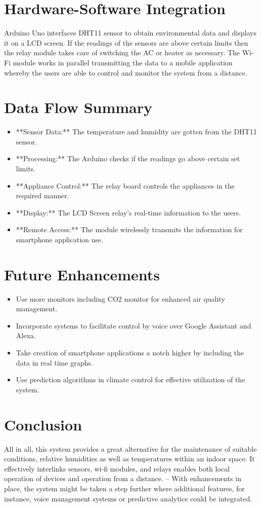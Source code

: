\documentclass[a4paper,12pt]{article}
\begin{document}
\section{Hardware-Software Integration}
Arduino Uno interfaces DHT11 sensor to obtain environmental data and displays it on a LCD screen. If the readings of the sensors are above certain limits then the relay module takes care of switching the AC or heater as necessary. The Wi-Fi module works in parallel transmitting the data to a mobile application whereby the users are able to control and monitor the system from a distance.
\section{Data Flow Summary}
\begin{itemize}
    \item **Sensor Data:** The temperature and humidity are gotten from the DHT11 sensor.
    \item **Processing:** The Arduino checks if the readings go above certain set limits.
    \item **Appliance Control:** The relay board controls the appliances in the required manner.
    \item **Display:** The LCD Screen relay’s real-time information to the users.
    \item **Remote Access:** The module wirelessly transmits the information for smartphone application use.
\end{itemize}

\section{Future Enhancements}
\begin{itemize}
    \item Use more monitors including CO2 monitor for enhanced air quality management.
    \item Incorporate systems to facilitate control by voice over Google Assistant and Alexa.
    \item Take creation of smartphone applications a notch higher by including the data in real time graphs.
    \item Use prediction algorithms in climate control for effective utilization of the system.
\end{itemize}

\section{Conclusion}
All in all, this system provides a great alternative for the maintenance of suitable conditions, relative humidities as well as temperatures within an indoor space. It effectively interlinks sensors, wi-fi modules, and relays enables both local operation of devices and operation from a distance. – With enhancements in place, the system might be taken a step further where additional features, for instance, voice management systems or predictive analytics could be integrated.
\end{document}
